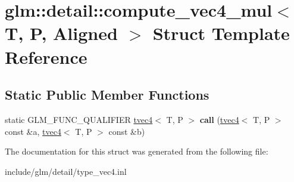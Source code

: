 \hypertarget{structglm_1_1detail_1_1compute__vec4__mul}{}\section{glm\+:\+:detail\+:\+:compute\+\_\+vec4\+\_\+mul$<$ T, P, Aligned $>$ Struct Template Reference}
\label{structglm_1_1detail_1_1compute__vec4__mul}
\subsection*{Static Public Member Functions}
\begin{DoxyCompactItemize}
\item 
\mbox{\label{structglm_1_1detail_1_1compute__vec4__mul_a1221df7a4f31872225a24d4638b48baf}} 
static G\+L\+M\+\_\+\+F\+U\+N\+C\+\_\+\+Q\+U\+A\+L\+I\+F\+I\+ER \hyperlink{structglm_1_1tvec4}{tvec4}$<$ T, P $>$ {\bfseries call} (\hyperlink{structglm_1_1tvec4}{tvec4}$<$ T, P $>$ const \&a, \hyperlink{structglm_1_1tvec4}{tvec4}$<$ T, P $>$ const \&b)
\end{DoxyCompactItemize}


The documentation for this struct was generated from the following file\+:\begin{DoxyCompactItemize}
\item 
include/glm/detail/type\+\_\+vec4.\+inl\end{DoxyCompactItemize}

